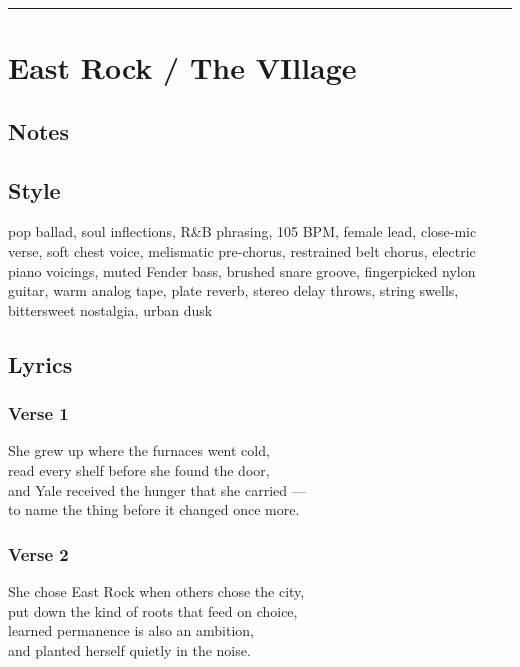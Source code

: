 \begin{center}\rule{0.5\linewidth}{0.5pt}\end{center}

\section{East Rock / The VIllage}\label{east-rock-the-village}

\subsection{Notes}\label{notes-30}

\subsection{Style}\label{style-29}

pop ballad, soul inflections, R\&B phrasing, 105 BPM, female lead,
close-mic verse, soft chest voice, melismatic pre-chorus, restrained
belt chorus, electric piano voicings, muted Fender bass, brushed snare
groove, fingerpicked nylon guitar, warm analog tape, plate reverb,
stereo delay throws, string swells, bittersweet nostalgia, urban dusk

\subsection{Lyrics}\label{lyrics-29}

\subsubsection{Verse 1}\label{verse-1-23}

She grew up where the furnaces went cold,\\
read every shelf before she found the door,\\
and Yale received the hunger that she carried ---\\
to name the thing before it changed once more.

\subsubsection{Verse 2}\label{verse-2-22}

She chose East Rock when others chose the city,\\
put down the kind of roots that feed on choice,\\
learned permanence is also an ambition,\\
and planted herself quietly in the noise.


